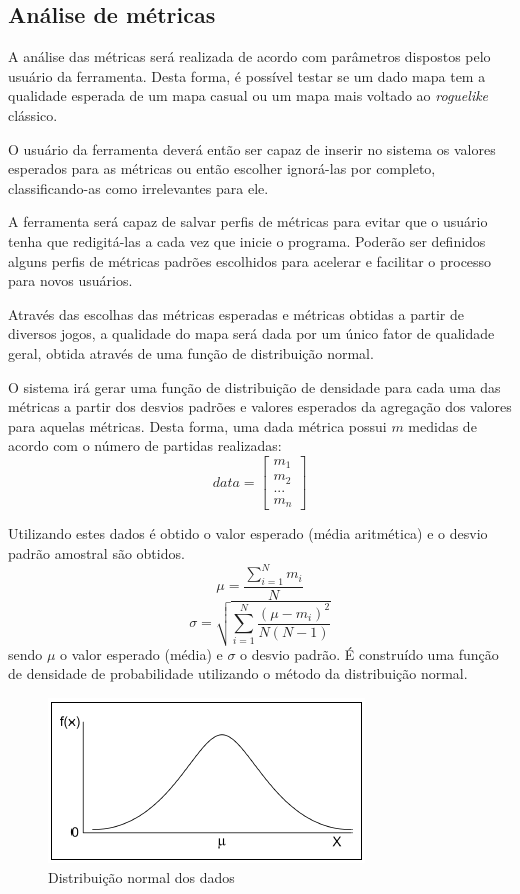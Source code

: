 \subsection{Análise de métricas}

A análise das métricas será realizada de acordo com parâmetros dispostos pelo usuário da ferramenta. Desta forma, é possível testar se um dado mapa tem a qualidade esperada de um mapa casual ou um mapa mais voltado ao \textit{roguelike} clássico. 

O usuário da ferramenta deverá então ser capaz de inserir no sistema os valores esperados para as métricas ou então escolher ignorá-las por completo, classificando-as como irrelevantes para ele.

A ferramenta será capaz de salvar perfis de métricas para evitar que o usuário tenha que redigitá-las a cada vez que inicie o programa. Poderão ser definidos alguns perfis de métricas padrões escolhidos para acelerar e facilitar o processo para novos usuários.

Através das escolhas das métricas esperadas e métricas obtidas a partir de diversos jogos, a qualidade do mapa será dada por um único fator de qualidade geral, obtida através de uma função de distribuição normal.

O sistema irá gerar uma função de distribuição de densidade \cite{montgomery} para cada uma das métricas a partir dos desvios padrões e valores esperados da agregação dos valores para aquelas métricas. Desta forma, uma dada métrica possui $m$ medidas de acordo com o número de partidas realizadas:
\begin{equation}
data = 
\begin{bmatrix}
	m_1 \\
	m_2 \\
	... \\
	m_n
\end{bmatrix}
\end{equation}

Utilizando estes dados é obtido o valor esperado (média aritmética) e o desvio padrão amostral são obtidos.
\begin{equation}
	\mu = \frac{\sum_{i=1}^{N} m_i}{N}
\end{equation}
\begin{equation}
	\sigma = \sqrt{\sum_{i=1}^{N} \frac{(\mu-m_i)^2}{N(N-1)}}
\end{equation}
sendo $\mu$ o valor esperado (média) e $\sigma$ o desvio padrão. É construído uma função de densidade de probabilidade utilizando o método da distribuição normal. 
\begin{figure}[h]
	\centering
	\label{fig15}
		\includegraphics[keepaspectratio=true,scale=0.7]{figuras/fig15-normal.png}
	\caption{Distribuição normal dos dados}
\end{figure}

